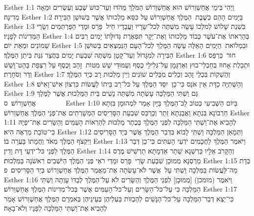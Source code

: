 Esther 1:1	וַיְהִי בִּימֵי אֲחַשְׁוֵרוֹשׁ הוּא אֲחַשְׁוֵרוֹשׁ הַמֹּלֵךְ מֵהֹדּוּ וְעַד־כּוּשׁ שֶׁבַע וְעֶשְׂרִים וּמֵאָה מְדִינָה׃
Esther 1:2	בַּיָּמִים הָהֵם כְּשֶׁבֶת  הַמֶּלֶךְ אֲחַשְׁוֵרוֹשׁ עַל כִּסֵּא מַלְכוּתוֹ אֲשֶׁר בְּשׁוּשַׁן הַבִּירָה׃
Esther 1:3	בִּשְׁנַת שָׁלוֹשׁ לְמלְכוֹ עָשָׂה מִשְׁתֶּה לְכל־שָׂרָיו וַעֲבָדָיו חֵיל  פָּרַס וּמָדַי הַפַּרְתְּמִים וְשָׂרֵי הַמְּדִינוֹת לְפָנָיו׃
Esther 1:4	בְּהַרְאֹתוֹ אֶת־עֹשֶׁר כְּבוֹד מַלְכוּתוֹ וְאֶת־יְקָר תִּפְאֶרֶת גְּדוּלָּתוֹ יָמִים רַבִּים שְׁמוֹנִים וּמְאַת יוֹם׃
Esther 1:5	וּבִמְלוֹאת  הַיָּמִים הָאֵלֶּה עָשָׂה הַמֶּלֶךְ לְכל־הָעָם הַנִּמְצְאִים בְּשׁוּשַׁן הַבִּירָה לְמִגָּדוֹל וְעַד־קָטָן מִשְׁתֶּה שִׁבְעַת יָמִים בַּחֲצַר גִּנַּת בִּיתַן הַמֶּלֶךְ׃
Esther 1:6	חוּר  כַּרְפַּס וּתְכֵלֶת אָחוּז בְּחַבְלֵי־בוּץ וְאַרְגָּמָן עַל־גְּלִילֵי כֶסֶף וְעַמּוּדֵי שֵׁשׁ מִטּוֹת  זָהָב וָכֶסֶף עַל רִצְפַת בַּהַט־וָשֵׁשׁ וְדַר וְסֹחָרֶת׃
Esther 1:7	וְהַשְׁקוֹת בִּכְלֵי זָהָב וְכֵלִים מִכֵּלִים שׁוֹנִים וְיֵין מַלְכוּת רָב כְּיַד הַמֶּלֶךְ׃
Esther 1:8	וְהַשְּׁתִיָּה כַדָּת אֵין אֹנֵס כִּי־כֵן  יִסַּד הַמֶּלֶךְ עַל כּל־רַב בֵּיתוֹ לַעֲשׂוֹת כִּרְצוֹן אִישׁ־וָאִישׁ׃
Esther 1:9	גַּם וַשְׁתִּי הַמַּלְכָּה עָשְׂתָה מִשְׁתֵּה נָשִׁים בֵּית הַמַּלְכוּת אֲשֶׁר לַמֶּלֶךְ אֲחַשְׁוֵרוֹשׁ׃ {ס}        
Esther 1:10	בַּיּוֹם הַשְּׁבִיעִי כְּטוֹב לֵב־הַמֶּלֶךְ בַּיָּיִן אָמַר לִמְהוּמָן בִּזְּתָא חַרְבוֹנָא בִּגְתָא וַאֲבַגְתָא זֵתַר וְכַרְכַּס שִׁבְעַת הַסָּרִיסִים הַמְשָׁרְתִים אֶת־פְּנֵי הַמֶּלֶךְ אֲחַשְׁוֵרוֹשׁ׃
Esther 1:11	לְהָבִיא אֶת־וַשְׁתִּי הַמַּלְכָּה לִפְנֵי הַמֶּלֶךְ בְּכֶתֶר מַלְכוּת לְהַרְאוֹת הָעַמִּים וְהַשָּׂרִים אֶת־יפְיָהּ כִּי־טוֹבַת מַרְאֶה הִיא׃
Esther 1:12	וַתְּמָאֵן הַמַּלְכָּה וַשְׁתִּי לָבוֹא בִּדְבַר הַמֶּלֶךְ אֲשֶׁר בְּיַד הַסָּרִיסִים וַיִּקְצֹף הַמֶּלֶךְ מְאֹד וַחֲמָתוֹ בָּעֲרָה בוֹ׃
Esther 1:13	וַיֹּאמֶר הַמֶּלֶךְ לַחֲכָמִים יֹדְעֵי הָעִתִּים כִּי־כֵן דְּבַר הַמֶּלֶךְ לִפְנֵי כּל־יֹדְעֵי דָּת וָדִין׃
Esther 1:14	וְהַקָּרֹב אֵלָיו כַּרְשְׁנָא שֵׁתָר אַדְמָתָא תַרְשִׁישׁ מֶרֶס מַרְסְנָא מְמוּכָן שִׁבְעַת שָׂרֵי  פָּרַס וּמָדַי רֹאֵי פְּנֵי הַמֶּלֶךְ הַיֹּשְׁבִים רִאשֹׁנָה בַּמַּלְכוּת׃
Esther 1:15	כְּדָת מַה־לַּעֲשׂוֹת בַּמַּלְכָּה וַשְׁתִּי עַל  אֲשֶׁר לֹא־עָשְׂתָה אֶת־מַאֲמַר הַמֶּלֶךְ אֲחַשְׁוֵרוֹשׁ בְּיַד הַסָּרִיסִים׃ {פ}
Esther 1:16	וַיֹּאמֶר (מומכן) [מְמוּכָן] לִפְנֵי הַמֶּלֶךְ וְהַשָּׂרִים לֹא עַל־הַמֶּלֶךְ לְבַדּוֹ עָוְתָה וַשְׁתִּי הַמַּלְכָּה כִּי עַל־כּל־הַשָּׂרִים וְעַל־כּל־הָעַמִּים אֲשֶׁר בְּכל־מְדִינוֹת הַמֶּלֶךְ אֲחַשְׁוֵרוֹשׁ׃
Esther 1:17	כִּי־יֵצֵא דְבַר־הַמַּלְכָּה עַל־כּל־הַנָּשִׁים לְהַבְזוֹת בַּעְלֵיהֶן בְּעֵינֵיהֶן בְּאמְרָם הַמֶּלֶךְ אֲחַשְׁוֵרוֹשׁ אָמַר לְהָבִיא אֶת־וַשְׁתִּי הַמַּלְכָּה לְפָנָיו וְלֹא־בָאָה׃
